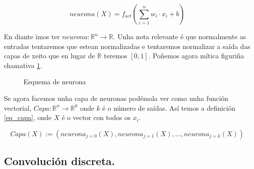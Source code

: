 \documentclass{article}
\begin{document}
\begin{equation}
    neurona(X) = f_{act}(\sum_{i=1}^{n} w_i \cdot x_i + b)
    \label{eq_neuron}
\end{equation}

En diante imos ter $neurona: \mathbb{R}^n \rightarrow \mathbb{R}$. Unha nota relevante é que normalmente as entradas tentaremos que estean normalizadas e tentaremos normalizar a saída das capas de xeito que en lugar de $\mathbb{R}$ teremos $[0,1]$. Poñemos agora mítica figuriña chamativa \ref{fig:esq_nerona}. 

\begin{figure}[h]
    \centering


    \caption{Esquema de neurona}
    \label{fig:esq_nerona}
\end{figure}


Se agora facemos unha capa de neuronas podémola ver como unha función vectorial, $Capa: \mathbb{R}^n \rightarrow \mathbb{R}^k$ onde $k$ é o número de saídas. Así temos a definición \ref{eq_capa}, onde $X$ é o vector con todos os $x_i$.

\begin{equation}
    Capa(X) := (neurona_{j=0}(X), neurona_{j=1}(X), ..., neurona_{j=k}(X))
    \label{eq_capa}
\end{equation}

\subsection{Convolución discreta.}
\end{document}

